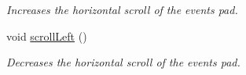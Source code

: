 \begin{DoxyCompactItemize}
\begin{DoxyCompactList}\small\item\em Increases the horizontal scroll of the events pad. \end{DoxyCompactList}\item 
void \hyperlink{structslb_1_1core_1_1ui_1_1LogWindow_a3f0f66ce0c962bbfcc06f77d4f5914e9}{scroll\+Left} ()\hypertarget{structslb_1_1core_1_1ui_1_1LogWindow_a3f0f66ce0c962bbfcc06f77d4f5914e9}{}\label{structslb_1_1core_1_1ui_1_1LogWindow_a3f0f66ce0c962bbfcc06f77d4f5914e9}

\begin{DoxyCompactList}\small\item\em Decreases the horizontal scroll of the events pad. \end{DoxyCompactList}\end{DoxyCompactItemize}

